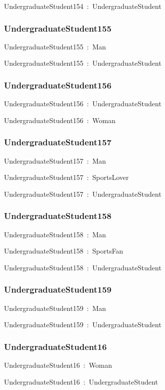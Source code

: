 \documentclass{article}
\begin{document}
UndergraduateStudent154~:~UndergraduateStudent

\subsubsection*{UndergraduateStudent155}

UndergraduateStudent155~:~Man

UndergraduateStudent155~:~UndergraduateStudent

\subsubsection*{UndergraduateStudent156}

UndergraduateStudent156~:~UndergraduateStudent

UndergraduateStudent156~:~Woman

\subsubsection*{UndergraduateStudent157}

UndergraduateStudent157~:~Man

UndergraduateStudent157~:~SportsLover

UndergraduateStudent157~:~UndergraduateStudent

\subsubsection*{UndergraduateStudent158}

UndergraduateStudent158~:~Man

UndergraduateStudent158~:~SportsFan

UndergraduateStudent158~:~UndergraduateStudent

\subsubsection*{UndergraduateStudent159}

UndergraduateStudent159~:~Man

UndergraduateStudent159~:~UndergraduateStudent

\subsubsection*{UndergraduateStudent16}

UndergraduateStudent16~:~Woman

UndergraduateStudent16~:~UndergraduateStudent
\end{document}
